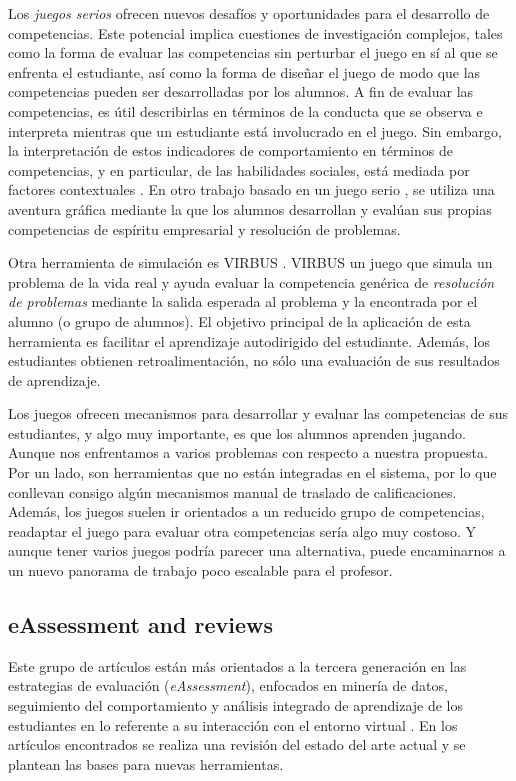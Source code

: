 Los \emph{juegos serios} ofrecen nuevos desafíos y oportunidades para el desarrollo de competencias. Este potencial implica cuestiones de investigación complejos, tales como la forma de evaluar las competencias sin perturbar el juego en sí al que se enfrenta el estudiante, así como la forma de diseñar el juego de modo que las competencias pueden ser desarrolladas por los alumnos. A fin de evaluar las competencias, es útil describirlas en términos de la conducta que se observa e interpreta mientras que un estudiante está involucrado en el juego. Sin embargo, la interpretación de estos indicadores de comportamiento en términos de competencias, y en particular, de las habilidades sociales, está mediada por factores contextuales \cite{Bedek:2011}. En otro trabajo basado en un juego serio \cite{Guenaga:2013}, se utiliza una aventura gráfica mediante la que los alumnos desarrollan y evalúan sus propias competencias de espíritu empresarial y resolución de problemas.

Otra herramienta de simulación es VIRBUS \cite{Starcic:2008,Starcic:2008a}. VIRBUS un juego que simula un problema de la vida real y ayuda evaluar la competencia genérica de \emph{resolución de problemas} mediante la salida esperada al problema y la encontrada por el alumno (o grupo de alumnos). El objetivo principal de la aplicación de esta herramienta es facilitar el aprendizaje autodirigido del estudiante. Además, los estudiantes obtienen retroalimentación, no sólo una evaluación de sus resultados de aprendizaje.

Los juegos ofrecen mecanismos para desarrollar y evaluar las competencias de sus estudiantes, y algo muy importante, es que los alumnos aprenden jugando. Aunque nos enfrentamos a varios problemas con respecto a nuestra propuesta. Por un lado, son herramientas que no están integradas en el sistema, por lo que conllevan consigo algún mecanismos manual de traslado de calificaciones. Además, los juegos suelen ir orientados a un reducido grupo de competencias, readaptar el juego para evaluar otra competencias sería algo muy costoso. Y aunque tener varios juegos podría parecer una alternativa, puede encaminarnos a un nuevo panorama de trabajo poco escalable para el profesor. 


\subsection{eAssessment and reviews}
Este grupo de artículos están más orientados a la tercera generación en las estrategias de evaluación (\emph{eAssessment}), enfocados en minería de datos, seguimiento del comportamiento y análisis integrado de aprendizaje de los estudiantes en lo referente a su interacción con el entorno virtual \cite{Redecker:2012,Redecker:2013}. En los artículos encontrados se realiza una revisión del estado del arte actual y se plantean las bases para nuevas herramientas.

